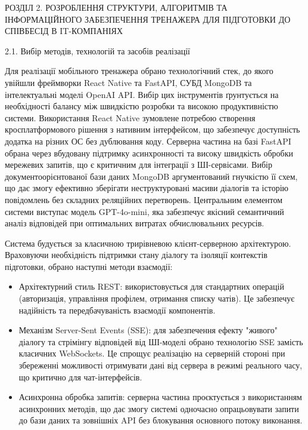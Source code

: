 \documentclass[
]{article}
\begin{document}
\protect{}\label{_Toc228981058}{}РОЗДІЛ 2. РОЗРОБЛЕННЯ
СТРУКТУРИ, АЛГОРИТМІВ ТА ІНФОРМАЦІЙНОГО ЗАБЕЗПЕЧЕННЯ ТРЕНАЖЕРА ДЛЯ
ПІДГОТОВКИ ДО СПІВБЕСІД В IT-КОМПАНІЯХ

\protect{}\label{_Toc228981059}{}2.1. Вибір методів,
технологій та засобів реалізації

Для реалізації мобільного тренажера обрано технологічний стек, до якого
увійшли фреймворки React Native та FastAPI, СУБД MongoDB та
інтелектуальні моделі OpenAI API. Вибір цих інструментів ґрунтується на
необхідності балансу між швидкістю розробки та високою продуктивністю
системи. Використання React Native зумовлене потребою створення
кросплатформового рішення з нативним інтерфейсом, що забезпечує
доступність додатка на різних ОС без дублювання коду. Серверна частина
на базі FastAPI обрана через вбудовану підтримку асинхронності та високу
швидкість обробки мережевих запитів, що є критичним для інтеграції з
ШІ-сервісами. Вибір документоорієнтованої бази даних MongoDB
аргументований гнучкістю її схем, що дає змогу ефективно зберігати
неструктуровані масиви діалогів та історію повідомлень без складних
реляційних перетворень. Центральним елементом системи виступає модель
GPT-4o-mini, яка забезпечує якісний семантичний аналіз відповідей при
оптимальних витратах обчислювальних ресурсів.

Система будується за класичною трирівневою клієнт-серверною
архітектурою. Враховуючи необхідність підтримки стану діалогу та
ізоляції контекстів підготовки, обрано наступні методи взаємодії:

\begin{itemize}
\item
  Архітектурний стиль REST: використовується для стандартних операцій
  (авторизація, управління профілем, отримання списку чатів). Це
  забезпечує надійність та передбачуваність взаємодії компонентів.
\item
  Механізм Server-Sent Events (SSE): для забезпечення ефекту "живого"
  діалогу та стрімінгу відповідей від ШІ-моделі обрано технологію SSE
  замість класичних WebSockets. Це спрощує реалізацію на серверній
  стороні при збереженні можливості отримувати дані від сервера в режимі
  реального часу, що критично для чат-інтерфейсів.
\item
  Асинхронна обробка запитів: серверна частина проєктується з
  використанням асинхронних методів, що дає змогу системі одночасно
  опрацьовувати запити до бази даних та зовнішніх API без блокування
  основного потоку виконання.
\end{itemize}
\end{document}
